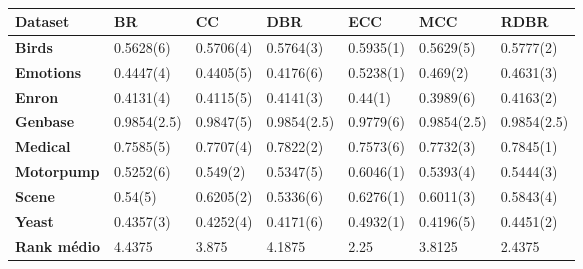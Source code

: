 \begin{table}[h]
\begin{tabular}{lllllll}
\hline
\textbf{Dataset}    & \textbf{BR} & \textbf{CC} & \textbf{DBR} & \textbf{ECC} & \textbf{MCC} & \textbf{RDBR} \\ \hline
\textbf{Birds}      & 0.5628(6)   & 0.5706(4)   & 0.5764(3)    & 0.5935(1)    & 0.5629(5)    & 0.5777(2)     \\
\textbf{Emotions}   & 0.4447(4)   & 0.4405(5)   & 0.4176(6)    & 0.5238(1)    & 0.469(2)     & 0.4631(3)     \\
\textbf{Enron}      & 0.4131(4)   & 0.4115(5)   & 0.4141(3)    & 0.44(1)      & 0.3989(6)    & 0.4163(2)     \\
\textbf{Genbase}    & 0.9854(2.5) & 0.9847(5)   & 0.9854(2.5)  & 0.9779(6)    & 0.9854(2.5)  & 0.9854(2.5)   \\
\textbf{Medical}    & 0.7585(5)   & 0.7707(4)   & 0.7822(2)    & 0.7573(6)    & 0.7732(3)    & 0.7845(1)     \\
\textbf{Motorpump}  & 0.5252(6)   & 0.549(2)    & 0.5347(5)    & 0.6046(1)    & 0.5393(4)    & 0.5444(3)     \\
\textbf{Scene}      & 0.54(5)     & 0.6205(2)   & 0.5336(6)    & 0.6276(1)    & 0.6011(3)    & 0.5843(4)     \\
\textbf{Yeast}      & 0.4357(3)   & 0.4252(4)   & 0.4171(6)    & 0.4932(1)    & 0.4196(5)    & 0.4451(2)     \\ \hline
\textbf{Rank médio} & 4.4375      & 3.875       & 4.1875       & 2.25         & 3.8125       & 2.4375        \\ \hline
\end{tabular}
\caption{\legendaTab{\EBA}{\jqo}}
\label{tab:EBAj48}
\end{table}